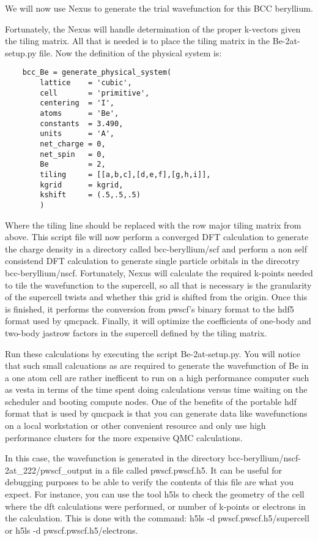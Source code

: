 We will now use Nexus to generate the trial wavefunction for this BCC beryllium.

Fortunately, the Nexus will handle determination of the proper k-vectors given the tiling matrix.  All that is needed is to place the tiling matrix in the Be-2at-setup.py file.   Now the definition of the physical system is:

\begin{lstlisting}
    bcc_Be = generate_physical_system(
        lattice    = 'cubic',
        cell       = 'primitive',
        centering  = 'I',
        atoms      = 'Be',
        constants  = 3.490,
        units      = 'A',
        net_charge = 0,
        net_spin   = 0,
        Be         = 2,
        tiling     = [[a,b,c],[d,e,f],[g,h,i]],
        kgrid      = kgrid,
        kshift     = (.5,.5,.5)
        )
\end{lstlisting}
Where the tiling line should be replaced with the row major tiling matrix from above.  This script file will now perform a converged DFT calculation to generate the charge density in a directory called bcc-beryllium/scf and perform a non self consistend DFT calculation to generate single particle orbitals in the direcotry bcc-beryllium/nscf.  Fortunately, Nexus will calculate the required k-points needed to tile the wavefunction to the supercell, so all that is necessary is the granularity of the supercell twists and whether this grid is shifted from the origin.  Once this is finished, it performs the conversion from pwscf's binary format to the hdf5 format used by qmcpack.  Finally, it will optimize the coefficients of one-body and two-body jastrow factors in the supercell defined by the tiling matrix.

Run these calculations by executing the script Be-2at-setup.py.  You will notice that such small calcuations as are required to generate the wavefunction of Be in a one atom cell are rather inefficent to run on a high performance computer such as vesta in terms of the time spent doing calculations versus time waiting on the scheduler and booting compute nodes.  One of the benefits of the portable hdf format that is used by qmcpack is that you can generate data like wavefunctions on a local workstation or other convenient resource and only use high performance clusters for the more expensive QMC calculations.

In this case, the wavefunction is generated in the directory bcc-beryllium/nscf-2at\_222/pwscf\_output in a file called pwscf.pwscf.h5.  It can be useful for debugging purposes to be able to verify the contents of this file are what you expect.  For instance, you can use the tool h5ls to check the geometry of the cell where the dft calculations were performed, or number of k-points or electrons in the calculation.  This is done with the command: h5ls -d pwscf.pwscf.h5/supercell or h5ls -d pwscf.pwscf.h5/electrons.


